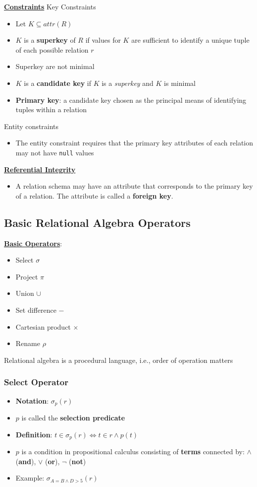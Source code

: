 \textbf{\underline{Constraints}}
\bigskip
Key Constraints \label{keyConstraints}
\begin{itemize}
    \item Let $K\subseteq attr(R)$
    \item $K$ is a \textbf{superkey} of $R$ if values for $K$ are sufficient to identify a unique tuple of each possible relation $r$
    \item Superkey are not minimal
    \item $K$ is a \textbf{candidate key} if $K$ is a \textit{superkey} and $K$ is minimal
    \item \textbf{Primary key}: a candidate key chosen as the principal means of identifying tuples within a relation
\end{itemize}
Entity constraints
\begin{itemize}
    \item The entity constraint requires that the primary key attributes of each relation may not have \texttt{null} values
\end{itemize}
\textbf{\underline{Referential Integrity}}
\bigskip
\begin{itemize}
    \item A relation schema may have an attribute that corresponds to the primary key of a relation. The attribute is called a \textbf{foreign key}.
\end{itemize}

\subsection{Basic Relational Algebra Operators}

\textbf{\underline{Basic Operators}}:
\begin{itemize}
    \item Select $\sigma$
    \item Project $\pi$
    \item Union $\cup$
    \item Set difference $-$
    \item Cartesian product $\times$
    \item Rename $\rho$
\end{itemize}

Relational algebra is a procedural language, i.e., order of operation matters

\subsubsection{Select Operator}
\begin{itemize}
    \item \textbf{Notation}: $\sigma_p(r)$
    \item $p$ is called the \textbf{selection predicate}
    \item \textbf{Definition}: $t\in \sigma_p(r) \Leftrightarrow t \in r \land p(t)$
    \item $p$ is a condition in propositional calculus consisting of \textbf{terms} connected by: $\land$ (\textbf{and}), $\lor$ (\textbf{or}), $\lnot$ (\textbf{not})
    \item Example: $\sigma_{A=B\land D >5}(r)$
\end{itemize}

